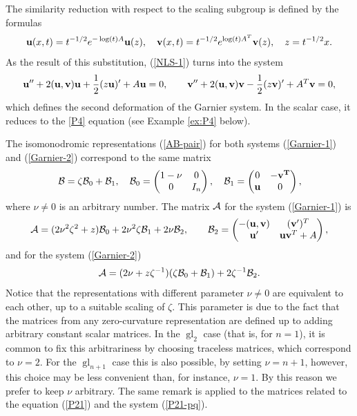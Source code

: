 \documentclass[11pt]{article}
\theoremstyle{plain}
\theoremstyle{definition}
\begin{document}
The similarity reduction with respect to the scaling subgroup is defined by the formulas
\begin{equation}\label{uv-self}
 {\bf u}(x,t)=t^{-1/2}e^{-\log(t)A}{\bf u}(z),\quad
 {\bf v}(x,t)=t^{-1/2}e^{\log(t)A^T}{\bf v}(z),\quad 
 z=t^{-1/2}x.
\end{equation} 
As the result of this substitution, (\ref{NLS-1}) turns into the system
\begin{equation}\label{Garnier-2}
 {\bf u}''+2({\bf u},{\bf v}){\bf u}+\frac{1}{2}(z{\bf u})'+A{\bf u}=0,\qquad
 {\bf v}''+2({\bf u},{\bf v}){\bf v}-\frac{1}{2}(z{\bf v})'+A^T{\bf v}=0,
\end{equation}
which defines the second deformation of the Garnier system. In the scalar case, it reduces to the \ref{P4} equation (see Example \ref{ex:P4} below).

The isomonodromic representations (\ref{AB-pair}) for both systems (\ref{Garnier-1}) and (\ref{Garnier-2}) correspond to the same matrix
\[
 {\cal B}=\zeta{\cal B}_0+{\cal B}_1,\quad
 {\cal B}_0=\begin{pmatrix}
  1-\nu & 0\\
   0 & I_n  
 \end{pmatrix},\quad
 {\cal B}_1=\begin{pmatrix}
  0 & -\bf v^T\\
  \bf u & 0  
 \end{pmatrix},
\]
where $\nu\ne0$ is an arbitrary number. The matrix $\cal A$ for the system (\ref{Garnier-1}) is 
\[
 {\cal A}=(2\nu^2\zeta^2+z){\cal B}_0+2\nu^2\zeta{\cal B}_1+2\nu{\cal B}_2,\qquad 
 {\cal B}_2=\begin{pmatrix}
   -({\bf u},{\bf v}) & ({\bf v}')^T\\
    {\bf u}' & {\bf u}{\bf v}^T+A  
 \end{pmatrix},
\]
and for the system (\ref{Garnier-2})
\[
 {\cal A}=(2\nu+z\zeta^{-1})(\zeta{\cal B}_0+{\cal B}_1)+2\zeta^{-1}{\cal B}_2.
\]
Notice that the representations with different parameter $\nu\ne0$ are equivalent to each other, up to a suitable scaling of $\zeta$. This parameter is due to the fact that the matrices from any zero-curvature representation are defined up to adding arbitrary constant scalar matrices. In the $\operatorname{gl}_2$ case (that is, for $n=1$), it is common to fix this arbitrariness by choosing traceless matrices, which correspond to $\nu=2$. For the $\operatorname{gl}_{n+1}$ case this is also possible, by setting $\nu=n+1$, however, this choice may be less convenient than, for instance, $\nu=1$. By this reason we prefer to keep $\nu$ arbitrary. The same remark is applied to the matrices related to the equation (\ref{P21}) and the system (\ref{P21-pq}).
\end{document}
